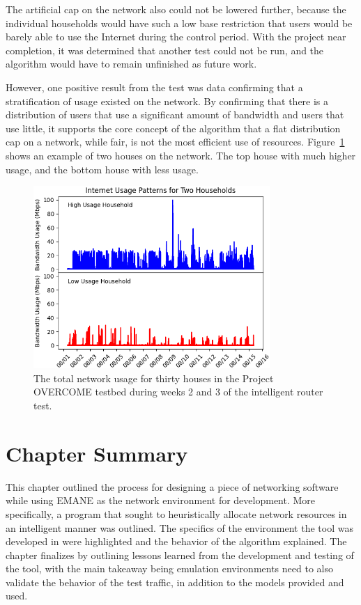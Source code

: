 The artificial cap on the network also could not be lowered further, because the individual households would have such a low base restriction that users would be barely able to use the Internet during the control period.
With the project near completion, it was determined that another test could not be run, and the algorithm would have to remain unfinished as future work.\par
However, one positive result from the test was data confirming that a stratification of usage existed on the network.
By confirming that there is a distribution of users that use a significant amount of bandwidth and users that use little, it supports the core concept of the algorithm that a flat distribution cap on a network, while fair, is not the most efficient use of resources.
Figure~\ref{usage_compare} shows an example of two houses on the network. The top house with much higher usage, and the bottom house with less usage.
\begin{figure}[!ht]
    \centering
    \includegraphics[width=0.8\textwidth,keepaspectratio]{Images/Chpt4/Network_Compare.png}
    \caption{The total network usage for thirty houses in the Project OVERCOME testbed during weeks 2 and 3 of the intelligent router test.}
    \label{usage_compare}
\end{figure}

\section{Chapter Summary}
This chapter outlined the process for designing a piece of networking software while using EMANE as the network environment for development.
More specifically, a program that sought to heuristically allocate network resources in an intelligent manner was outlined.
The specifics of the environment the tool was developed in were highlighted and the behavior of the algorithm explained.
The chapter finalizes by outlining lessons learned from the development and testing of the tool, with the main takeaway being emulation environments need to also validate the behavior of the test traffic, in addition to the models provided and used.